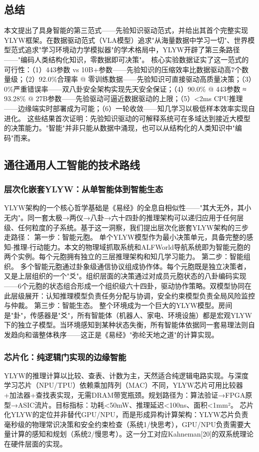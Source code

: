 \documentclass[12pt,a4paper]{article}
\begin{document}
\subsection{总结}
本文提出了具身智能的第三范式——先验知识驱动范式，并给出其首个完整实现YLYW框架。在数据驱动范式（VLA模型）追求"从海量数据中学习一切"、世界模型范式追求"学习环境动力学模拟器"的学术格局中，YLYW开辟了第三条路径——"编码人类结构化知识，零数据即可决策"。
核心实验数据证实了这一范式的可行性：（1）443参数 vs 10B+参数——先验知识的压缩效率比数据驱动高7个数量级；（2）92.0\%合理率 @ 零训练数据——先验知识可直接驱动高质量决策；（3）0\%严重错误率——双八卦安全架构实现先天安全保证；（4）90.0\% @ 443参数 ≈ 93.28\% @ 27B参数——先验驱动可逼近数据驱动的上限；（5）<2ms CPU推理——边缘端实时部署成为可能；（6）一轮收敛——知几学习以极低样本效率实现自进化。
这些结果首次证明：先验知识驱动的可解释系统可在多域达到接近大模型的决策能力。"智能"并非只能从数据中涌现，也可以从结构化的人类知识中"编码"而来。

\subsection{通往通用人工智能的技术路线}

\subsubsection{层次化嵌套YLYW：从单智能体到智能生态}
YLYW架构的一个核心哲学基础是《易经》的全息自相似性——"其大无外，其小无内"。同一套太极→两仪→八卦→六十四卦的推理架构可以递归应用于任何层级、任何粒度的子系统。基于这一洞察，我们提出层次化嵌套YLYW架构的三步走路径：
第一步：智能元胞。 单个YLYW模型作为最小决策单元，具备完整的感知-推理-行动能力。本文的物理域抓取系统和ALFWorld导航系统即为智能元胞的两个实例。每个元胞拥有独立的三层推理架构和知几学习能力。
第二步：智能组织。 多个智能元胞通过卦象级通信协议组成协作体。每个元胞既是独立决策者，又是上层组织的一个"爻"。组织层面的决策通过对成员元胞状态的八卦编码实现——6个元胞的状态组合形成一个组织级六十四卦，驱动协作策略。双模型协同在此层级展开：认知推理模型负责任务分配与协调，安全约束模型负责全局风险监控与仲裁。
第三步：智能生态。 整个环境成为一个巨大的YLYW模型。房间是"卦"，传感器是"爻"，所有智能体（机器人、家电、环境设施）都是宏观YLYW下的独立子模型。当环境感知到某种状态失衡，所有智能体依据同一套易理法则自发趋向和谐整体秩序——这正是《易经》"弥纶天地之道"的计算实现。

\subsubsection{芯片化：纯逻辑门实现的边缘智能}
YLYW的推理计算以比较、查表、计数为主，天然适合纯逻辑电路实现。与深度学习芯片（NPU/TPU）依赖乘加阵列（MAC）不同，YLYW芯片可用比较器+加法器+查找表实现，无需DRAM带宽瓶颈。规划路径为：算法验证→FPGA原型→ASIC流片。目标指标：功耗<50mW、推理延迟<100ns、面积<1mm²。
芯片化YLYW的定位并非替代GPU/NPU，而是形成异构计算架构：YLYW芯片负责毫秒级的物理常识决策和安全约束检查（系统1/快思考），GPU/NPU负责需要大量计算的感知和规划（系统2/慢思考）。这一分工对应Kahneman[20]的双系统理论在硬件层面的实现。
\end{document}
